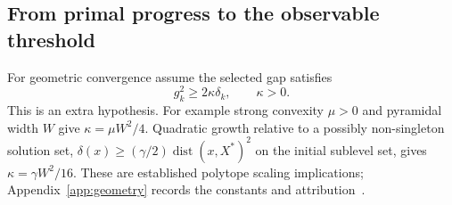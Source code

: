 \subsection{From primal progress to the observable threshold}
For geometric convergence assume the selected gap satisfies
\begin{equation}\label{eq:geometry}
 g_k^2\ge2\kappa\delta_k,\qquad\kappa>0.
\end{equation}
This is an extra hypothesis. For example strong convexity $\mu>0$
and pyramidal width $W$ give $\kappa=\mu W^2/4$.
Quadratic growth relative to a possibly non-singleton solution set,
$\delta(x)\ge(\gamma/2)\operatorname{dist}(x,X^*)^2$ on the initial
sublevel set, gives $\kappa=\gamma W^2/16$.
These are established polytope scaling implications;
Appendix~\ref{app:geometry} records the constants and
attribution~\cite{lacostejaggi,restartfw}.

